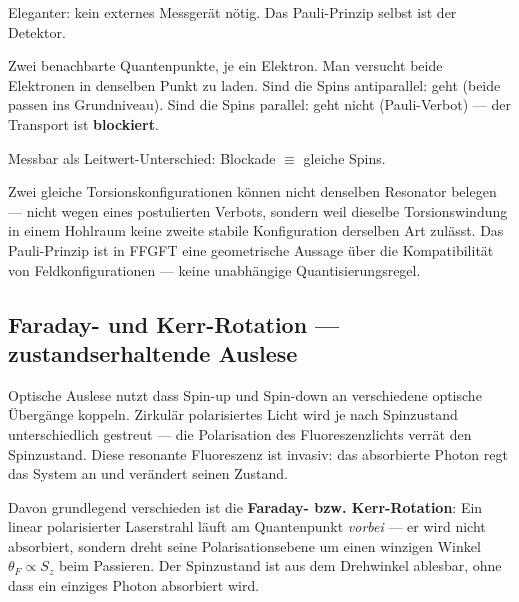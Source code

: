 Eleganter: kein externes Messgerät nötig.
Das Pauli-Prinzip selbst ist der Detektor.

Zwei benachbarte Quantenpunkte, je ein Elektron.
Man versucht beide Elektronen in denselben Punkt zu laden.
Sind die Spins antiparallel: geht (beide passen ins Grundniveau).
Sind die Spins parallel: geht nicht (Pauli-Verbot) ---
der Transport ist \textbf{blockiert}.

Messbar als Leitwert-Unterschied: Blockade $\equiv$ gleiche Spins.

\begin{foundation}
Zwei gleiche Torsionskonfigurationen können nicht
denselben Resonator belegen --- nicht wegen eines
postulierten Verbots, sondern weil dieselbe Torsionswindung
in einem Hohlraum keine zweite stabile Konfiguration
derselben Art zulässt.
Das Pauli-Prinzip ist in FFGFT eine geometrische Aussage
über die Kompatibilität von Feldkonfigurationen ---
keine unabhängige Quantisierungsregel.
\end{foundation}

\subsection{Faraday- und Kerr-Rotation --- zustandserhaltende Auslese}
\label{sec:optisch-auslesen}

Optische Auslese nutzt dass Spin-up und Spin-down
an verschiedene optische Übergänge koppeln.
Zirkulär polarisiertes Licht wird je nach Spinzustand
unterschiedlich gestreut --- die Polarisation
des Fluoreszenzlichts verrät den Spinzustand.
Diese resonante Fluoreszenz ist invasiv: das absorbierte
Photon regt das System an und verändert seinen Zustand.

Davon grundlegend verschieden ist die
\textbf{Faraday- bzw. Kerr-Rotation}:
Ein linear polarisierter Laserstrahl läuft am Quantenpunkt
\emph{vorbei} --- er wird nicht absorbiert, sondern dreht
seine Polarisationsebene um einen winzigen Winkel
$\theta_F \propto S_z$ beim Passieren.
Der Spinzustand ist aus dem Drehwinkel ablesbar,
ohne dass ein einziges Photon absorbiert wird.

